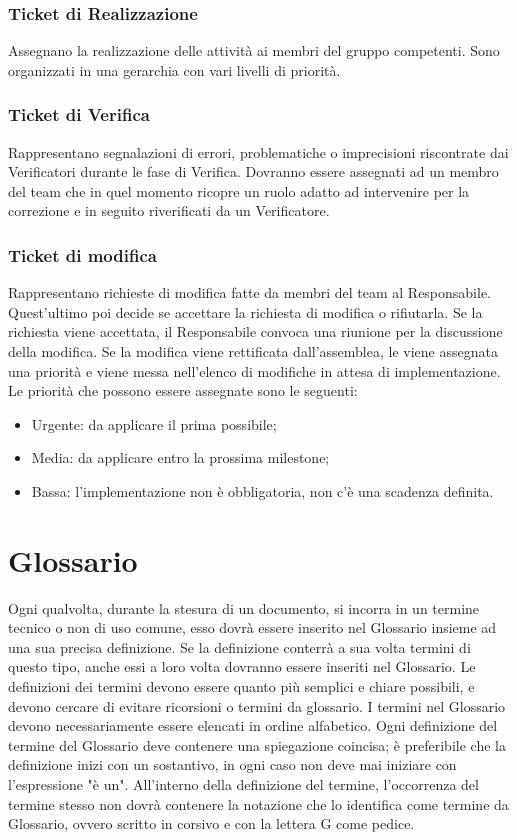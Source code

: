 \subsubsection{Ticket di Realizzazione}
\label{8.4.2}
Assegnano la realizzazione delle attività ai membri del gruppo competenti. Sono organizzati in una gerarchia con vari livelli di priorità.

\subsubsection{Ticket di Verifica}
\label{8.4.3}
Rappresentano segnalazioni di errori, problematiche o imprecisioni riscontrate dai Verificatori durante le fase di Verifica. Dovranno essere assegnati ad un membro del team che in quel momento ricopre un ruolo adatto ad intervenire per la correzione e in seguito riverificati da un Verificatore.


\subsubsection{Ticket di modifica}
\label{8.4.4}
Rappresentano richieste di modifica fatte da membri del team al Responsabile. Quest'ultimo poi decide se accettare la richiesta di modifica o rifiutarla. Se la richiesta viene accettata, il Responsabile convoca una riunione per la discussione della modifica. Se la modifica viene rettificata dall'assemblea, le viene assegnata una priorità e viene messa nell'elenco di modifiche in attesa di implementazione.
Le priorità che possono essere assegnate sono le seguenti:
\begin{itemize}
\item Urgente: da applicare il prima possibile;
\item Media: da applicare entro la prossima milestone;
\item Bassa: l'implementazione non è obbligatoria, non c'è una scadenza definita.
\end{itemize}

\newpage
\section{Glossario}
\label{9.0}
Ogni qualvolta, durante la stesura di un documento, si incorra in un termine tecnico o non di uso comune, esso dovrà essere inserito nel Glossario insieme ad una sua precisa definizione. Se la definizione conterrà a sua volta termini di questo tipo, anche essi a loro volta dovranno essere inseriti nel Glossario.
Le definizioni dei termini devono essere quanto più semplici e chiare possibili, e devono cercare di evitare ricorsioni o termini da glossario.
I termini nel Glossario devono necessariamente essere elencati in ordine alfabetico.
Ogni definizione del termine del Glossario deve contenere una spiegazione coincisa; è preferibile che la definizione inizi con un sostantivo, in ogni caso non deve mai iniziare con l'espressione "è un".
All'interno della definizione del termine, l'occorrenza del termine stesso non dovrà contenere la notazione che lo identifica come termine da Glossario, ovvero scritto in corsivo e con la lettera G come pedice.

